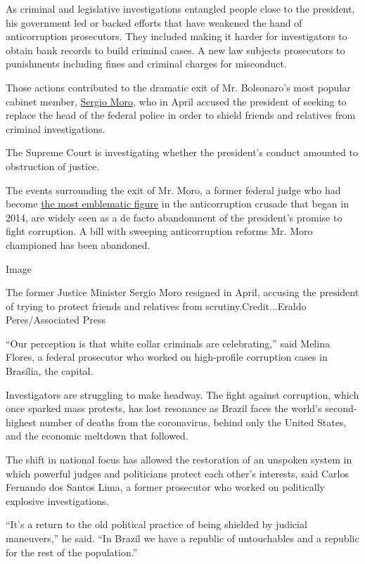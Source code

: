 As criminal and legislative investigations entangled people close to the
president, his government led or backed efforts that have weakened the
hand of anticorruption prosecutors. They included making it harder for
investigators to obtain bank records to build criminal cases. A new law
subjects prosecutors to punishments including fines and criminal charges
for misconduct.

Those actions contributed to the dramatic exit of Mr. Bolsonaro's most
popular cabinet member,
\href{https://www.nytimes3xbfgragh.onion/2020/04/24/world/americas/brazil-bolsonaro-moro.html?searchResultPosition=1}{Sergio
Moro}, who in April accused the president of seeking to replace the head
of the federal police in order to shield friends and relatives from
criminal investigations.

The Supreme Court is investigating whether the president's conduct
amounted to obstruction of justice.

The events surrounding the exit of Mr. Moro, a former federal judge who
had become
\href{https://www.nytimes3xbfgragh.onion/2017/08/25/world/americas/judge-sergio-moro-brazil-anti-corruption.html}{the
most emblematic figure} in the anticorruption crusade that began in
2014, are widely seen as a de facto abandonment of the president's
promise to fight corruption. A bill with sweeping anticorruption reforms
Mr. Moro championed has been abandoned.

Image

The former Justice Minister Sergio Moro resigned in April, accusing the
president of trying to protect friends and relatives from
scrutiny.Credit...Eraldo Peres/Associated Press

``Our perception is that white collar criminals are celebrating,'' said
Melina Flores, a federal prosecutor who worked on high-profile
corruption cases in Brasília, the capital.

Investigators are struggling to make headway. The fight against
corruption, which once sparked mass protests, has lost resonance as
Brazil faces the world's second-highest number of deaths from the
coronavirus, behind only the United States, and the economic meltdown
that followed.

The shift in national focus has allowed the restoration of an unspoken
system in which powerful judges and politicians protect each other's
interests, said Carlos Fernando dos Santos Lima, a former prosecutor who
worked on politically explosive investigations.

``It's a return to the old political practice of being shielded by
judicial maneuvers,'' he said. ``In Brazil we have a republic of
untouchables and a republic for the rest of the population.''

